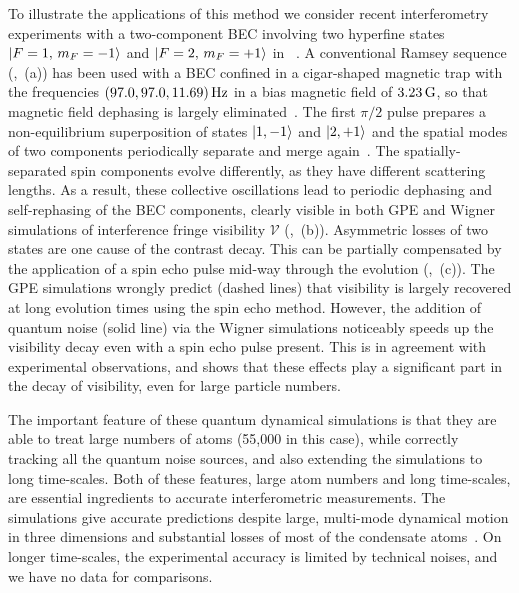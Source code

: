 To illustrate the applications of this method we consider recent interferometry
experiments with a two-component BEC involving two hyperfine states
${\mbox{\ensuremath{\vert F=1,\, m_F=-1 \rangle}}}$ and ${\mbox{\ensuremath{\vert F=2,\, m_F=+1 \rangle}}}$ in \Rb~\cite{Egorov2011}.
A conventional Ramsey sequence (,~(a)) has been used
with a BEC confined in a cigar-shaped magnetic trap with the frequencies $(97.0, 97.0, 11.69)\mbox{\ensuremath{\,\mathrm{Hz}}}$
in a bias magnetic field of $3.23\mbox{\ensuremath{\,\mathrm{G}}}$, so that magnetic field dephasing is largely eliminated~\cite{Hall1998}.
The first $\pi/2$ pulse prepares a non-equilibrium superposition of states ${\mbox{\ensuremath{\vert 1,-1 \rangle}}}$ and ${\mbox{\ensuremath{\vert 2,+1 \rangle}}}$
and the spatial modes of two components periodically separate and merge again~\cite{Mertes2007}.
The spatially-separated spin components evolve differently, as they have
different scattering lengths.
As a result, these collective oscillations lead to periodic dephasing and
self-rephasing of the BEC components, clearly visible in both GPE and Wigner
simulations of interference fringe visibility
$\mathcal{V}$ (,~(b)).
Asymmetric losses of two states are one cause of the contrast decay.
This can be partially compensated by the application of a spin echo pulse
mid-way through the evolution (,~(c)).
The GPE simulations wrongly predict (dashed lines) that visibility is largely
recovered at long evolution times using the spin echo method.
However, the addition of quantum noise (solid line) via the Wigner simulations
noticeably speeds up the visibility decay even with a spin echo pulse present.
This is in agreement with experimental observations, and shows that these
effects play a significant part in the decay of visibility, even for
large particle numbers.

The important feature of these quantum dynamical simulations
is that they are able to treat large numbers of atoms (55,000 in this case),
while correctly tracking all the quantum noise sources, and also extending the simulations to long time-scales.
Both of these features, large atom numbers and long time-scales,
are essential ingredients to accurate interferometric measurements.
The simulations give accurate predictions despite large, multi-mode dynamical motion in three dimensions
and substantial losses of most of the condensate atoms~\cite{Egorov2011}.
On longer time-scales, the experimental accuracy is limited by technical noises, and we have no data for comparisons.
